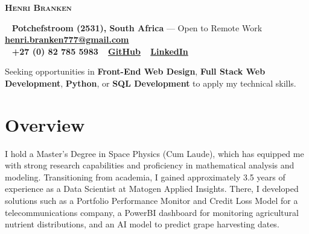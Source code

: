 \documentclass[a4paper,10pt]{article}
\begin{document}
\begin{center}
	{\Huge\textbf{\textsc{\textcolor{burnt}{Henri Branken}}}}\\[0.5cm]
\end{center}

\begin{tcolorbox}[
	colback=teal!10, %
	colframe=teal,   %
	boxrule=1pt, %
	width=\textwidth,
	left=10pt, right=10pt, %
	sharp corners=northwest
	]
	\begin{center}
		\faHome~ \textbf{Potchefstroom (2531), South Africa} --- Open to Remote Work \quad \faEnvelope~ \href{mailto:henri.branken777@gmail.com}{\textbf{henri.branken777@gmail.com}} \quad\\ \faPhone~ \textbf{+27 (0) 82 785 5983} \quad \faGithub~ \href{https://github.com/HenriBranken}{\textbf{GitHub}} \quad
		\faLinkedin~ \href{https://www.linkedin.com/in/henri-branken-1423a2153/}{\textbf{LinkedIn}}
	\end{center}
\end{tcolorbox}


\begin{tcolorbox}[
	colback=burntshade,    %
	colframe=burnt,     %
	boxrule=1pt,        %
	sharp corners=northwest,
	rounded corners=southwest,
	coltitle=white,     %
	fonttitle=\large\bfseries\scshape,  %
	title=Career Objective,
	width=\textwidth,   %
	left=10pt, right=10pt, top=5pt, bottom=5pt  %
	]
	Seeking opportunities in \textbf{Front-End Web Design}, \textbf{Full Stack Web Development}, \textbf{Python}, or \textbf{SQL Development} to apply my technical skills.
\end{tcolorbox}

\section*{Overview}
I hold a Master's Degree in Space Physics (Cum Laude), which has equipped me with strong research capabilities and proficiency in mathematical analysis and modeling. Transitioning from academia, I gained approximately 3.5 years of experience as a Data Scientist at Matogen Applied Insights. There, I developed solutions such as a Portfolio Performance Monitor and Credit Loss Model for a telecommunications company, a PowerBI dashboard for monitoring agricultural nutrient distributions, and an AI model to predict grape harvesting dates.
\end{document}
